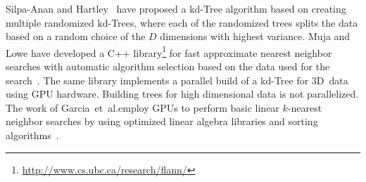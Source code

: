 


   Silpa-Anan and Hartley~\cite{silpa2008a} have proposed 
  a kd-Tree algorithm based on creating multiple randomized kd-Trees, where 
  each of the randomized trees splits the data based on a random choice of the 
  $D$ dimensions with highest variance.  Muja and Lowe have developed a C++ 
  library\footnote{\url{http://www.cs.ubc.ca/research/flann/}} for fast 
  approximate nearest neighbor searches with automatic algorithm selection 
  based on the data used for the search~\cite{muja2009a,muja2014a}.  The same 
  library implements a parallel build of a kd-Tree for $3$D~data using GPU 
  hardware.  Building trees for high dimensional data is not parallelized.  The 
  work of Garcia~et~al.\@ employ GPUs to perform basic linear $k$-nearest 
  neighbor searches by using optimized linear algebra libraries and sorting 
  algorithms~\cite{garcia2008a,garcia2010a}.


